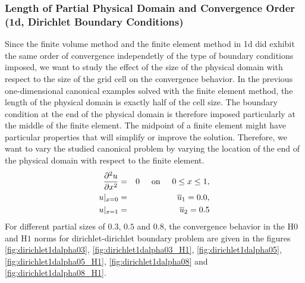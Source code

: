 \documentclass[a4paper,12pt]{article}
\begin{document}
\subsubsection{Length of Partial Physical Domain and Convergence Order (1d, Dirichlet Boundary Conditions)}
Since the finite volume method and the finite element method in 1d did exhibit the same order of convergence 
independetly of the type of boundary conditions imposed, we want to study the effect of the size of the physical domain with respect
to the size of the grid cell on the convergence behavior. In the previous one-dimensional canonical examples solved with the finite element method, the length
of the physical domain is exactly half of the cell size. The boundary condition at the end of the physical domain is therefore
imposed particularly at the middle of the finite element. The midpoint of a finite element might have particular properties
that will simplify or improve the solution. Therefore, we want to vary the studied canonical problem by varying the location of the end of the physical domain with respect to the finite element. 
\begin{eqnarray}
\frac{\partial^2 u}{\partial x^2} &=& 0 \hspace{0.5cm}\text{on}\hspace{0.5cm}0 \leq x\leq 1,\\
u\vert_{x=0} &=& \overline{u}_1 = 0.0,\\
u\vert_{x=1} &=& \overline{u}_2 = 0.5\\
\end{eqnarray}
For different partial sizes of $0.3$, $0.5$ and $0.8$, the convergence behavior in the H$0$ and H$1$ norms for dirichlet-dirichlet boundary problem are given in the figures \ref{fig:dirichlet1dalpha03}, \ref{fig:dirichlet1dalpha03_H1}, \ref{fig:dirichlet1dalpha05}, \ref{fig:dirichlet1dalpha05_H1}, \ref{fig:dirichlet1dalpha08} and \ref{fig:dirichlet1dalpha08_H1}.
\end{document}

